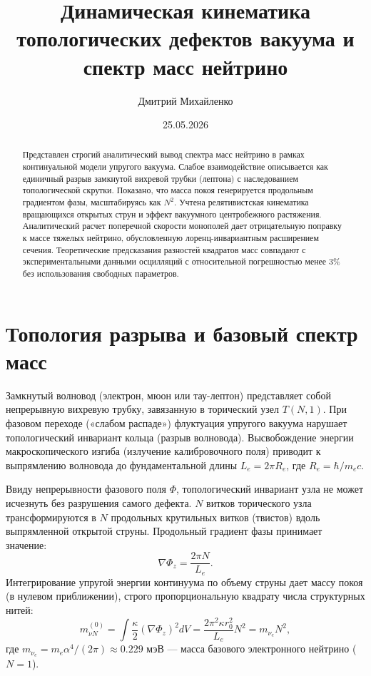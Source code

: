 \documentclass[12pt,a4paper]{article}
\title{Динамическая кинематика топологических дефектов вакуума и спектр масс нейтрино}
\author{Дмитрий Михайленко}
\date{25.05.2026}
\begin{document}
	
	\maketitle
	
	\begin{abstract}
		Представлен строгий аналитический вывод спектра масс нейтрино в рамках континуальной модели упругого вакуума. Слабое взаимодействие описывается как единичный разрыв замкнутой вихревой трубки (лептона) с наследованием топологической скрутки. Показано, что масса покоя генерируется продольным градиентом фазы, масштабируясь как $N^2$. Учтена релятивистская кинематика вращающихся открытых струн и эффект вакуумного центробежного растяжения. Аналитический расчет поперечной скорости монополей дает отрицательную поправку к массе тяжелых нейтрино, обусловленную лоренц-инвариантным расширением сечения. Теоретические предсказания разностей квадратов масс совпадают с экспериментальными данными осцилляций с относительной погрешностью менее 3\% без использования свободных параметров.
	\end{abstract}
	
	\section{Топология разрыва и базовый спектр масс}
	
	Замкнутый волновод (электрон, мюон или тау-лептон) представляет собой непрерывную вихревую трубку, завязанную в торический узел $T(N, 1)$. При фазовом переходе («слабом распаде») флуктуация упругого вакуума нарушает топологический инвариант кольца (разрыв волновода). Высвобождение энергии макроскопического изгиба (излучение калибровочного поля) приводит к выпрямлению волновода до фундаментальной длины $L_e = 2\pi R_e$, где $R_e = \hbar / m_e c$.
	
	Ввиду непрерывности фазового поля $\Phi$, топологический инвариант узла не может исчезнуть без разрушения самого дефекта. $N$ витков торического узла трансформируются в $N$ продольных крутильных витков (твистов) вдоль выпрямленной открытой струны. Продольный градиент фазы принимает значение:
	\begin{equation}
		\nabla \Phi_z = \frac{2\pi N}{L_e}.
	\end{equation}
	Интегрирование упругой энергии континуума по объему струны дает массу покоя (в нулевом приближении), строго пропорциональную квадрату числа структурных нитей:
	\begin{equation}
		m_{\nu N}^{(0)} = \int \frac{\kappa}{2} (\nabla \Phi_z)^2 dV = \frac{2\pi^2 \kappa r_0^2}{L_e} N^2 = m_{\nu_e} N^2,
	\end{equation}
	где $m_{\nu_e} = m_e \alpha^4 / (2\pi) \approx 0.229$ мэВ — масса базового электронного нейтрино ($N=1$).
	
\end{document}
